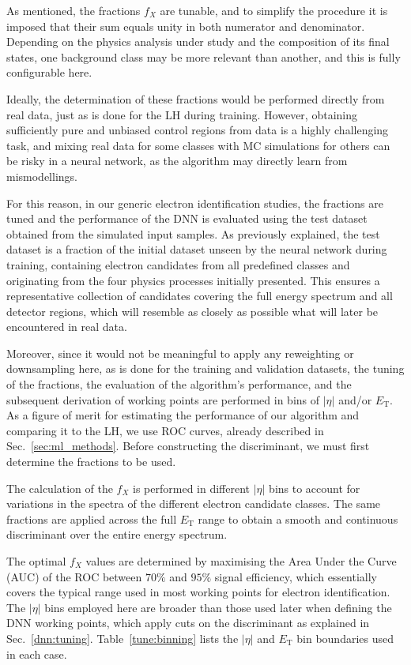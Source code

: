 As mentioned, the fractions $f_{X}$ are tunable, and to simplify the procedure it is imposed that their sum equals unity in both numerator and denominator. Depending on the physics analysis under study and the composition of its final states, one background class may be more relevant than another, and this is fully configurable here.

Ideally, the determination of these fractions would be performed directly from real data, just as is done for the LH during training. However, obtaining sufficiently pure and unbiased control regions from data is a highly challenging task, and mixing real data for some classes with MC simulations for others can be risky in a neural network, as the algorithm may directly learn from mismodellings.

For this reason, in our generic electron identification studies, the fractions are tuned and the performance of the DNN is evaluated using the test dataset obtained from the simulated input samples. As previously explained, the test dataset is a fraction of the initial dataset unseen by the neural network during training, containing electron candidates from all predefined classes and originating from the four physics processes initially presented. This ensures a representative collection of candidates covering the full energy spectrum and all detector regions, which will resemble as closely as possible what will later be encountered in real data.

Moreover, since it would not be meaningful to apply any reweighting or downsampling here, as is done for the training and validation datasets, the tuning of the fractions, the evaluation of the algorithm’s performance, and the subsequent derivation of working points are performed in bins of $|\eta|$ and/or $E_{\text{T}}$.  
As a figure of merit for estimating the performance of our algorithm and comparing it to the LH, we use ROC curves, already described in Sec.~\ref{sec:ml_methods}. Before constructing the discriminant, we must first determine the fractions to be used.

The calculation of the $f_{X}$ is performed in different $|\eta|$ bins to account for variations in the spectra of the different electron candidate classes. The same fractions are applied across the full $E_{\text{T}}$ range to obtain a smooth and continuous discriminant over the entire energy spectrum.

The optimal $f_{X}$ values are determined by maximising the Area Under the Curve (AUC) of the ROC between $70\%$ and $95\%$ signal efficiency, which essentially covers the typical range used in most working points for electron identification. The $|\eta|$ bins employed here are broader than those used later when defining the DNN working points, which apply cuts on the discriminant as explained in Sec.~\ref{dnn:tuning}.  
Table~\ref{tune:binning} lists the $|\eta|$ and $E_{\text{T}}$ bin boundaries used in each case.

